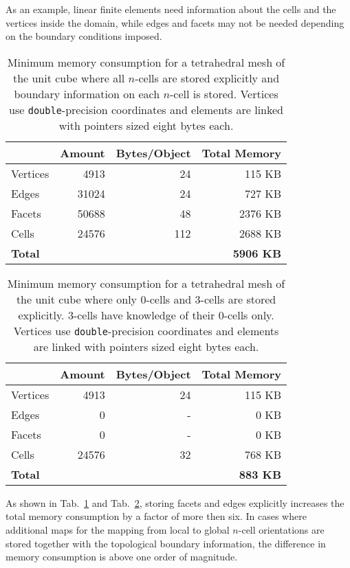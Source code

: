 As an example, linear finite elements need information about the cells and the vertices inside the domain, while edges and facets may not be needed depending on the boundary conditions imposed.

\begin{table}[tb]
 \centering
 \begin{tabular}{|l|r|r|r|}
  \hline
         & Amount      & Bytes/Object         & Total Memory \\
  \hline
  Vertices & 4913 & 24 & 115 KB \\
  \hline
  Edges   & 31024 & 24 & 727 KB \\
  \hline
  Facets  & 50688 & 48 & 2376 KB \\
  \hline
  Cells   & 24576 & 112 & 2688 KB \\
  \hline
  \textbf{Total}  &       &     &  \textbf{5906 KB} \\
  \hline
 \end{tabular}
 \caption{Minimum memory consumption for a tetrahedral mesh of the unit cube where all $n$-cells are stored explicitly and boundary information on each $n$-cell is stored. Vertices use \lstinline|double|-precision coordinates and elements are linked with pointers sized eight bytes each.}
 \label{tab:full-domain-memory}
\end{table}

\begin{table}[tb]
 \centering
 \begin{tabular}{|l|r|r|r|}
  \hline
         & Amount      & Bytes/Object         & Total Memory \\
  \hline
  Vertices & 4913 & 24 & 115 KB \\
  \hline
  Edges   & 0 & - & 0 KB \\
  \hline
  Facets  & 0 & - & 0 KB \\
  \hline
  Cells   & 24576 & 32 & 768 KB \\
  \hline
  \textbf{Total}  &       &     &  \textbf{883 KB} \\
  \hline
 \end{tabular}
 \caption{Minimum memory consumption for a tetrahedral mesh of the unit cube where only $0$-cells and $3$-cells are stored explicitly. $3$-cells have knowledge of their $0$-cells only. Vertices use \lstinline|double|-precision coordinates and elements are linked with pointers sized eight bytes each.}
 \label{tab:slim-domain-memory}
\end{table}

As shown in Tab.~\ref{tab:full-domain-memory} and Tab.~\ref{tab:slim-domain-memory}, storing facets and edges explicitly increases the total memory consumption by a factor of more then six. In cases where additional maps for the mapping from local to global $n$-cell orientations are stored together with the topological boundary information, the difference in memory consumption is above one order of magnitude.

